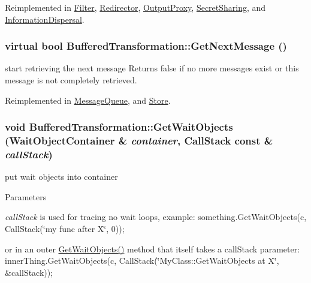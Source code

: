 Reimplemented in \hyperlink{class_filter_ad845deb5113d2bd04d109c05abfd3098}{Filter}, \hyperlink{class_redirector_a201243b803642ebfd392579953e75e92}{Redirector}, \hyperlink{class_output_proxy_aa6c68d78790266c60fa8b27176fbf969}{OutputProxy}, \hyperlink{class_secret_sharing_a670b6f5ba7ee9e1f029cd199f6722bb6}{SecretSharing}, and \hyperlink{class_information_dispersal_aa348e2dd4609c563196f89e1cf2ad35c}{InformationDispersal}.\hypertarget{class_buffered_transformation_aa7adffcae350fe528520a2427b21c0a9}{
\subsubsection[{GetNextMessage}]{\setlength{\rightskip}{0pt plus 5cm}virtual bool BufferedTransformation::GetNextMessage ()}}
\label{class_buffered_transformation_aa7adffcae350fe528520a2427b21c0a9}


start retrieving the next message Returns false if no more messages exist or this message is not completely retrieved. 

Reimplemented in \hyperlink{class_message_queue_a540da279953a13541a65c271888e27b7}{MessageQueue}, and \hyperlink{class_store_a5f578b4a2da5371a8a4b80a038a2d5ea}{Store}.\hypertarget{class_buffered_transformation_a127ccd1793fdda6548cd1295f848d0f7}{
\subsubsection[{GetWaitObjects}]{\setlength{\rightskip}{0pt plus 5cm}void BufferedTransformation::GetWaitObjects (WaitObjectContainer \& {\em container}, \/  CallStack const \& {\em callStack})}}
\label{class_buffered_transformation_a127ccd1793fdda6548cd1295f848d0f7}


put wait objects into container 
\begin{DoxyParams}{Parameters}
\item[{\em callStack}]is used for tracing no wait loops, example: something.GetWaitObjects(c, CallStack(\char`\"{}my func after X\char`\"{}, 0));
\begin{DoxyItemize}
\item or in an outer \hyperlink{class_buffered_transformation_a127ccd1793fdda6548cd1295f848d0f7}{GetWaitObjects()} method that itself takes a callStack parameter: innerThing.GetWaitObjects(c, CallStack(\char`\"{}MyClass::GetWaitObjects at X\char`\"{}, \&callStack)); 
\end{DoxyItemize}\end{DoxyParams}



